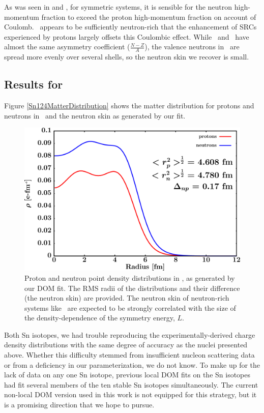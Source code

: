 As was seen
in \oSix and \caForty, for symmetric systems, it is sensible for the neutron high-momentum fraction
to exceed the proton high-momentum fraction on account of Coulomb. \snTwelve\
appears to be sufficiently neutron-rich that the enhancement of SRCs experienced by protons
largely offsets this Coulombic effect. While \snTwelve\ and \oEight\ have almost the same asymmetry
coefficient ($\frac{N-Z}{A}$), the valence neutrons in \snTwelve\ are spread more evenly over several
shells, so the neutron skin we recover is small.
\subsection{Results for \snFour}
Figure \ref{Sn124MatterDistribution} shows the matter distribution for protons and neutrons in
\snFour\ and the neutron skin as generated by our fit.
\begin{figure}[tb]
    \centering
    \includegraphics[width=\textwidth]{figures/sn124_matterDensity.png}
    \caption[Proton and neutron matter density distributions in \snFour]
    {
        Proton and neutron point density distributions in \snFour, as
        generated by our DOM fit. The RMS radii of the distributions and their
        difference (the neutron skin) are provided. The neutron skin of
        neutron-rich systems like \snFour\ are expected to be strongly correlated
        with the size of the density-dependence of the symmetry energy, $L$.
    }
    \label{sn124MatterDistribution}
\end{figure}
Both Sn isotopes, we had trouble
reproducing the experimentally-derived charge density distributions with
the same degree of accuracy as the nuclei presented above.
Whether this difficulty stemmed from insufficient nucleon scattering
data or from a deficiency in our parameterization, we do not know. To make up for the lack of data
on any one Sn isotope, previous local DOM fits on the Sn isotopes \cite{Charity2006, Mueller2011}
had fit several members of the ten stable Sn isotopes simultaneously.
The current non-local DOM version used in this work is not equipped for this strategy, but it is a
promising direction that we hope to pursue.

